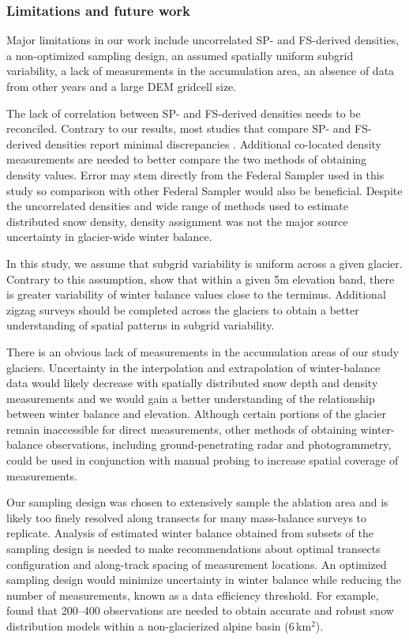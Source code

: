 \documentclass[twocolumn, letterpaper]{igs}
\begin{document}
\subsubsection{Limitations and future work}

Major limitations in our work include uncorrelated SP- and FS-derived densities, a non-optimized sampling design, an assumed spatially uniform subgrid variability, a lack of measurements in the accumulation area, an absence of data from other years and a large DEM gridcell size.  

The lack of correlation between SP- and FS-derived densities needs to be reconciled. Contrary to our results, most studies that compare SP- and FS-derived densities report minimal discrepancies \citep[e.g.][and sources within]{Dixon2012}. Additional co-located density measurements are needed to better compare the two methods of obtaining density values. Error may stem directly from the Federal Sampler used in this study so comparison with other Federal Sampler would also be beneficial. Despite the uncorrelated densities and wide range of methods used to estimate distributed snow density, density assignment was not the major source uncertainty in glacier-wide winter balance. 

In this study, we assume that subgrid variability is uniform across a given glacier. Contrary to this assumption, \cite{McGrath2015} show that within a given 5m elevation band, there is greater variability of winter balance values close to the terminus. Additional zigzag surveys should be completed across the glaciers to obtain a better understanding of spatial patterns in subgrid variability. 

There is an obvious lack of measurements in the accumulation areas of our study glaciers. Uncertainty in the interpolation and extrapolation of winter-balance data would likely decrease with spatially distributed snow depth and density measurements and we would gain a better understanding of the relationship between winter balance and elevation. Although certain portions of the glacier remain inaccessible for direct measurements, other methods of obtaining winter-balance observations, including ground-penetrating radar and photogrammetry, could be used in conjunction with manual probing to increase spatial coverage of measurements.

Our sampling design was chosen to extensively sample the ablation area and is likely too finely resolved along transects for many mass-balance surveys to replicate. Analysis of estimated winter balance obtained from subsets of the sampling design is needed to make recommendations about optimal transects configuration and along-track spacing of measurement locations. An optimized sampling design would minimize uncertainty in winter balance while reducing the number of measurements, known as a data efficiency threshold. For example, \cite{Lopez2010} found that 200--400 observations are needed to obtain accurate and robust snow distribution models within a non-glacierized alpine basin (6\,km$^2$). 
\end{document}
